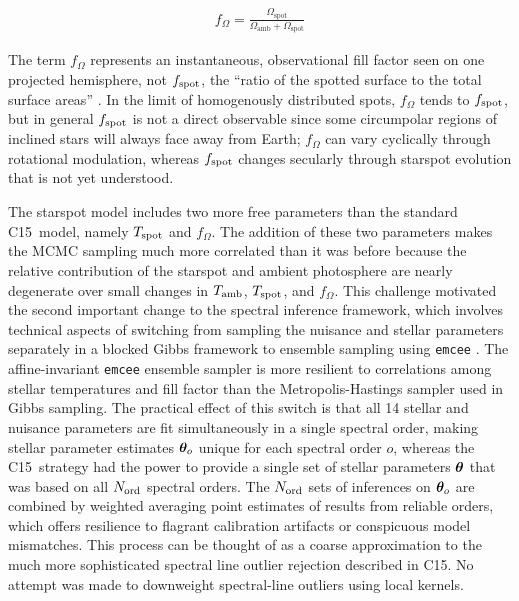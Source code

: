 \documentclass[twocolumn]{emulateapj}%
\newcommand{\iancze}{{\sc C15}}
\begin{document}
\begin{eqnarray} \label{eqn:fill_factor}
f_{\Omega} = \frac{\Omega_{\mathrm{spot}}}{\Omega_{\mathrm{amb}} + \Omega_{\mathrm{spot}}}
\end{eqnarray}

The term $f_{\Omega}$ represents an instantaneous, observational fill factor seen on one projected hemisphere, not $f_{\rm spot}$, the ``ratio of the spotted surface to the total surface areas'' \citep{somers15}.  In the limit of homogenously distributed spots, $f_{\Omega}$ tends to $f_{\rm spot}$, but in general $f_{\rm spot}$ is not a direct observable since some circumpolar regions of inclined stars will always face away from Earth; $f_{\Omega}$ can vary cyclically through rotational modulation, whereas $f_{\rm spot}$ changes secularly through starspot evolution that is not yet understood.

The starspot model includes two more free parameters than the standard \iancze\ model, namely $T_\textrm{spot}$ and $f_{\Omega}$.  The addition of these two parameters makes the MCMC sampling much more correlated than it was before because the relative contribution of the starspot and ambient photosphere are nearly degenerate over small changes in $T_\textrm{amb}$, $T_\textrm{spot}$, and $f_{\Omega}$.  This challenge motivated the second important change to the spectral inference framework, which involves technical aspects of switching from sampling the nuisance and stellar parameters separately in a blocked Gibbs framework to ensemble sampling using \texttt{emcee} \citep{foreman13}.  The affine-invariant \texttt{emcee} ensemble sampler is more resilient to correlations among stellar temperatures and fill factor than the Metropolis-Hastings sampler used in Gibbs sampling.  The practical effect of this switch is that all 14 stellar and nuisance parameters are fit simultaneously in a single spectral order, making stellar parameter estimates ${\bm \theta}_{o}$ unique for each spectral order $o$, whereas the \iancze\ strategy had the power to provide a single set of stellar parameters ${\bm \theta}$ that was based on all $N_{\rm ord}$ spectral orders.  The $N_{\rm ord}$ sets of inferences on ${\bm \theta}_{o}$ are combined by weighted averaging point estimates of results from reliable orders, which offers resilience to flagrant calibration artifacts or conspicuous model mismatches.  This process can be thought of as a coarse approximation to the much more sophisticated spectral line outlier rejection described in \iancze.  No attempt was made to downweight spectral-line outliers using local kernels.
\end{document}

